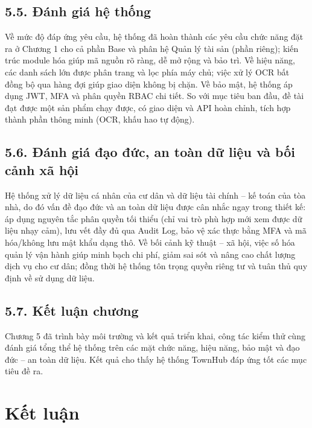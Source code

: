 \section*{5.5. Đánh giá hệ thống}
Về mức độ đáp ứng yêu cầu, hệ thống đã hoàn thành các yêu cầu chức năng đặt ra ở Chương 1 cho cả phần Base và phân hệ Quản lý tài sản (phần riêng); kiến trúc module hóa giúp mã nguồn rõ ràng, dễ mở rộng và bảo trì. Về hiệu năng, các danh sách lớn được phân trang và lọc phía máy chủ; việc xử lý OCR bất đồng bộ qua hàng đợi giúp giao diện không bị chặn. Về bảo mật, hệ thống áp dụng JWT, MFA và phân quyền RBAC chi tiết. So với mục tiêu ban đầu, đề tài đạt được một sản phẩm chạy được, có giao diện và API hoàn chỉnh, tích hợp thành phần thông minh (OCR, khấu hao tự động).

\section*{5.6. Đánh giá đạo đức, an toàn dữ liệu và bối cảnh xã hội}
Hệ thống xử lý dữ liệu cá nhân của cư dân và dữ liệu tài chính – kế toán của tòa nhà, do đó vấn đề đạo đức và an toàn dữ liệu được cân nhắc ngay trong thiết kế: áp dụng nguyên tắc phân quyền tối thiểu (chỉ vai trò phù hợp mới xem được dữ liệu nhạy cảm), lưu vết đầy đủ qua Audit Log, bảo vệ xác thực bằng MFA và mã hóa/không lưu mật khẩu dạng thô. Về bối cảnh kỹ thuật – xã hội, việc số hóa quản lý vận hành giúp minh bạch chi phí, giảm sai sót và nâng cao chất lượng dịch vụ cho cư dân; đồng thời hệ thống tôn trọng quyền riêng tư và tuân thủ quy định về sử dụng dữ liệu.

\section*{5.7. Kết luận chương}
Chương 5 đã trình bày môi trường và kết quả triển khai, công tác kiểm thử cùng đánh giá tổng thể hệ thống trên các mặt chức năng, hiệu năng, bảo mật và đạo đức – an toàn dữ liệu. Kết quả cho thấy hệ thống TownHub đáp ứng tốt các mục tiêu đề ra.

\chapter*{Kết luận}
